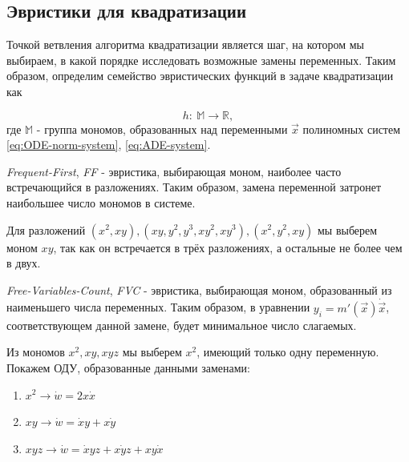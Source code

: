 \subsection{Эвристики для квадратизации} \label{sec:quad-heuristics}

Точкой ветвления алгоритма квадратизации является шаг, на котором мы выбираем, в какой порядке исследовать возможные замены переменных. Таким образом, определим семейство эвристических функций в задаче квадратизации как 

\begin{equation}
    h:\ \mathbb{M} \longrightarrow \mathbb{R},
\end{equation}
где $\mathbb{M}$ - группа мономов, образованных над переменными $\vec x$ полиномных систем \eqref{eq:ODE-norm-system}, \eqref{eq:ADE-system}. 

\begin{heuristics} \label{heur:FF}
    \textit{Frequent-First}, \textit{FF} - эвристика, выбирающая моном, наиболее часто встречающийся в разложениях. Таким образом, замена переменной затронет наибольшее число мономов в системе.
    
    \begin{example}
        Для разложений $(x^2, xy), (xy, y^2, y^3, xy^2, xy^3), (x^2, y^2, xy)$ мы выберем моном $xy$, так как он встречается в трёх разложениях, а остальные не более чем в двух.
    \end{example}
\end{heuristics}

\begin{heuristics} \label{heur:FVC}
    \textit{Free-Variables-Count}, \textit{FVC} - эвристика, выбирающая моном, образованный из наименьшего числа    переменных. Таким образом, в уравнении $y_i = m'(\vec x) \dot{\vec x}$, соответствующем данной замене, будет минимальное число слагаемых.
    
    \begin{example}
        Из мономов $x^2, xy, xyz$ мы выберем $x^2$, имеющий только одну переменную. Покажем ОДУ, образованные данными заменами:
        \begin{enumerate}
            \item $x^2 \longrightarrow \dot w = 2x \dot x$
            \item $xy \longrightarrow \dot w = \dot x y + x \dot y$
            \item $xyz \longrightarrow \dot w = \dot x yz + x \dot y z + xy \dot x$
        \end{enumerate}
    \end{example}
\end{heuristics}

